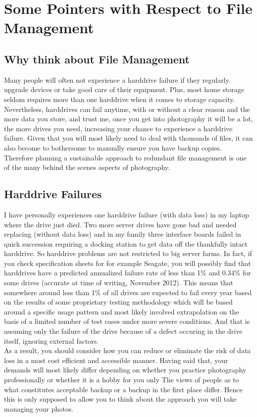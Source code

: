 \chapter{Some Pointers with Respect to File Management}

\section{Why think about File Management}

Many people will often not experience a harddrive failure if they regularly upgrade devices or take good care of their equipment. Plus, most home storage seldom requires more than one harddrive when it comes to storage capacity. Nevertheless, harddrives can fail anytime, with or without a clear reason and the more data you store, and trust me, once you get into photography it will be a lot, the more drives you need, increasing your chance to experience a harddrive failure. Given that you will most likely need to deal with thousands of files, it can also become to bothersome to manually ensure you have backup copies.
\\[\baselineskip]
Therefore planning a sustainable approach to redundant file management is one of the many behind the scenes aspects of photography.

\section{Harddrive Failures}

I have personally experiences one harddrive failure (with data loss) in my laptop where the drive just died. Two more server drives have gone bad and needed replacing (without data loss) and in my family three interface boards failed in quick succession requiring a docking station to get data off the thankfully intact harddrive.
So harddrive problems are not restricted to big server farms. In fact, if you check specification sheets for for example Seagate, you will possibly find that harddrives have a predicted annualized failure rate of less than 1\% and 0.34\% for some drives (accurate at time of writing, November 2012).
This means that somewhere around less than 1\% of all drives are expected to fail every year based on the results of some proprietary testing methodology which will be based around a specific usage pattern and most likely involved extrapolation on the basis of a limited number of test cases under more severe conditions. And that is assuming only the failure of the drive because of a defect occuring in the drive itself, ignoring external factors.
\\[\baselineskip]
As a result, you should consider how you can reduce or eliminate the risk of data loss in a most cost efficient and accessible manner. Having said that, your demands will most likely differ depending on whether you practice photography professionally or whether it is a hobby for you only
The views of people as to what constitutes acceptable backup or a backup in the first place differ. Hence this is only supposed to allow you to think about the approach you will take managing your photos.

